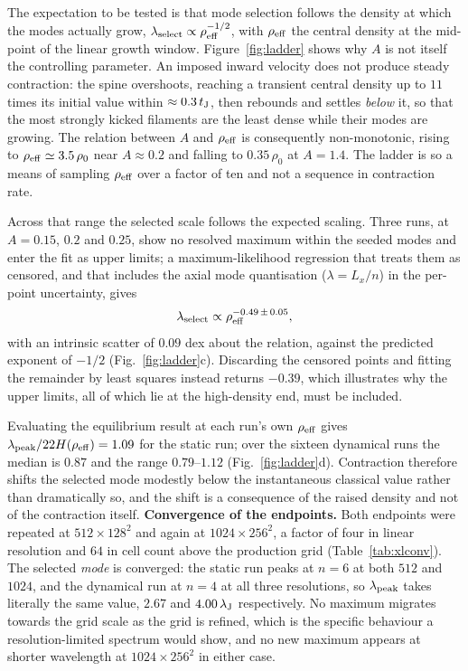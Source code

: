 \documentclass[usenatbib,twoside,twocolumn]{mnras}
\begin{document}
The expectation to be tested is that mode selection follows the density at which the modes actually grow, $\lambda_{\rm select}\propto\rho_{\rm eff}^{-1/2}$, with $\rho_{\rm eff}$ the central density at the mid-point of the linear growth window. Figure~\ref{fig:ladder} shows why $A$ is not itself the controlling parameter. An imposed inward velocity does not produce steady contraction: the spine overshoots, reaching a transient central density up to $11$ times its initial value within $\approx0.3\,t_{\rm J}$, then rebounds and settles \emph{below} it, so that the most strongly kicked filaments are the least dense while their modes are growing. The relation between $A$ and $\rho_{\rm eff}$ is consequently non-monotonic, rising to $\rho_{\rm eff}\simeq3.5\,\rho_0$ near $A\approx0.2$ and falling to $0.35\,\rho_0$ at $A=1.4$. The ladder is so a means of sampling $\rho_{\rm eff}$ over a factor of ten and not a sequence in contraction rate.

Across that range the selected scale follows the expected scaling. Three runs, at $A=0.15$, $0.2$ and $0.25$, show no resolved maximum within the seeded modes and enter the fit as upper limits; a maximum-likelihood regression that treats them as censored, and that includes the axial mode quantisation ($\lambda=L_x/n$) in the per-point uncertainty, gives
\begin{equation}
\lambda_{\rm select}\propto\rho_{\rm eff}^{-0.49\,\pm\,0.05},
\label{eq:ladderfit}
\end{equation}
with an intrinsic scatter of $0.09$ dex about the relation, against the predicted exponent of $-1/2$ (Fig.~\ref{fig:ladder}c). Discarding the censored points and fitting the remainder by least squares instead returns $-0.39$, which illustrates why the upper limits, all of which lie at the high-density end, must be included.

Evaluating the equilibrium result at each run's own $\rho_{\rm eff}$ gives $\lambda_{\rm peak}/22H(\rho_{\rm eff})=1.09$ for the static run; over the sixteen dynamical runs the median is $0.87$ and the range $0.79$--$1.12$ (Fig.~\ref{fig:ladder}d). Contraction therefore shifts the selected mode modestly below the instantaneous classical value rather than dramatically so, and the shift is a consequence of the raised density and not of the contraction itself. \smallskip\noindent\textbf{Convergence of the endpoints.} Both endpoints were repeated at $512\times128^2$ and again at $1024\times256^2$, a factor of four in linear resolution and $64$ in cell count above the production grid (Table~\ref{tab:xlconv}). The selected \emph{mode} is converged: the static run peaks at $n=6$ at both $512$ and $1024$, and the dynamical run at $n=4$ at all three resolutions, so $\lambda_{\rm peak}$ takes literally the same value, $2.67$ and $4.00\,\lambda_{\rm J}$ respectively. No maximum migrates towards the grid scale as the grid is refined, which is the specific behaviour a resolution-limited spectrum would show, and no new maximum appears at shorter wavelength at $1024\times256^2$ in either case.
\end{document}
